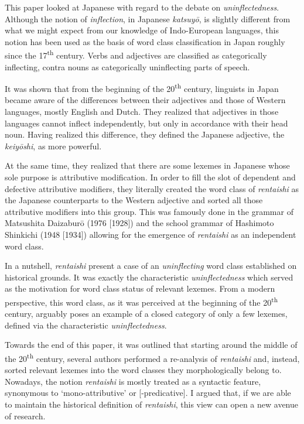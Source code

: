 \documentclass[output=paper]{langscibook}
\begin{document}
This paper looked at Japanese with regard to the debate on \textit{uninflectedness}. Although the notion of \textit{inflection}, in Japanese \textit{katsuyō}, is slightly different from what we might expect from our knowledge of Indo-European languages, this notion has been used as the basis of word class classification in Japan roughly since the 17\textsuperscript{th} century. Verbs and adjectives are classified as categorically inflecting, contra nouns as categorically uninflecting parts of speech.

It was shown that from the beginning of the 20\textsuperscript{th} century, linguists in Japan became aware of the differences between their adjectives and those of Western languages, mostly English and Dutch. They realized that adjectives in those languages cannot inflect independently, but only in accordance with their head noun. Having realized this difference, they defined the Japanese adjective, the \textit{keiyōshi}, as more powerful.

At the same time, they realized that there are some lexemes in Japanese whose sole purpose is attributive modification. In order to fill the slot of dependent and defective attributive modifiers, they literally created the word class of \textit{rentaishi} as the Japanese counterparts to the Western adjective and sorted all those attributive modifiers into this group. This was famously done in the grammar of Matsushita Daizaburō (1976 [1928]) and the school grammar of Hashimoto Shinkichi (1948 [1934]) allowing for the emergence of \textit{rentaishi} as an independent word class.

In a nutshell, \textit{rentaishi} present a case of an \textit{uninflecting} word class established on historical grounds. It was exactly the characteristic \textit{uninflectedness} which served as the motivation for word class status of relevant lexemes. From a modern perspective, this word class, as it was perceived at the beginning of the 20\textsuperscript{th} century, arguably poses an example of a closed category of only a few lexemes, defined via the characteristic \textit{uninflectedness}. 

Towards the end of this paper, it was outlined that starting around the middle of the 20\textsuperscript{th} century, several authors performed a re-analysis of \textit{rentaishi} and, instead, sorted relevant lexemes into the word classes they morphologically belong to. Nowadays, the notion \textit{rentaishi} is mostly treated as a syntactic feature, synonymous to ‘mono-attributive’ or [-predicative]. I argued that, if we are able to maintain the historical definition of \textit{rentaishi}, this view can open a new avenue of research.
\end{document}
